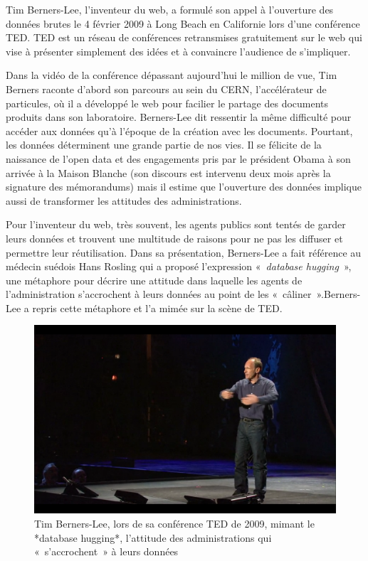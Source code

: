 \documentclass[]{book}
\theoremstyle{definition}
\theoremstyle{definition}
\theoremstyle{definition}
\theoremstyle{remark}
\begin{document}
Tim Berners-Lee, l'inventeur du web, a formulé son appel à l'ouverture
des données brutes le 4 février 2009 à Long Beach en Californie lors
d'une conférence TED. TED est un réseau de conférences retransmises
gratuitement sur le web qui vise à présenter simplement des idées et à
convaincre l'audience de s'impliquer.

Dans la vidéo de la conférence dépassant aujourd'hui le million de vue,
Tim Berners raconte d'abord son parcours au sein du CERN, l'accélérateur
de particules, où il a développé le web pour facilier le partage des
documents produits dans son laboratoire. Berners-Lee dit ressentir la
même difficulté pour accéder aux données qu'à l'époque de la création
avec les documents. Pourtant, les données déterminent une grande partie
de nos vies. Il se félicite de la naissance de l'open data et des
engagements pris par le président Obama à son arrivée à la Maison
Blanche (son discours est intervenu deux mois après la signature des
mémorandums) mais il estime que l'ouverture des données implique aussi
de transformer les attitudes des administrations.

Pour l'inventeur du web, très souvent, les agents publics sont tentés de
garder leurs données et trouvent une multitude de raisons pour ne pas
les diffuser et permettre leur réutilisation. Dans sa présentation,
Berners-Lee a fait référence au médecin suédois Hans Rosling qui a
proposé l'expression «~\emph{database hugging}~», une métaphore pour
décrire une attitude dans laquelle les agents de l'administration
s'accrochent à leurs données au point de les «~câliner~».Berners-Lee a
repris cette métaphore et l'a mimée sur la scène de TED.

\begin{figure}

{\centering \includegraphics[width=0.7\linewidth]{./img/hug} 

}

\caption{Tim Berners-Lee, lors de sa conférence TED de 2009, mimant le *database hugging*, l’attitude des administrations qui « s’accrochent » à leurs données}\label{fig:unnamed-chunk-2}
\end{figure}
\end{document}
